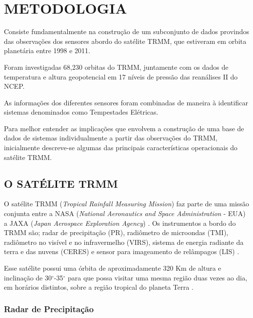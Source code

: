 \chapter{METODOLOGIA}

Consiste fundamentalmente na construção de um subconjunto de dados provindos das observações dos sensores abordo do satélite TRMM, que estiveram em orbita planetária entre 1998 e 2011. 

Foram investigadas 68,230 orbitas do TRMM, juntamente com os dados de temperatura e altura geopotencial em 17 níveis de pressão das reanálises II do NCEP. 

As informações dos diferentes sensores foram combinadas de maneira à identificar sistemas denominados como Tempestades Elétricas. 

Para melhor entender as implicações que envolvem a construção de uma base de dados de sistemas individualmente a partir das observações do TRMM, inicialmente descreve-se algumas das principais características operacionais do satélite TRMM.

\section{O SATÉLITE TRMM}

O satélite TRMM (\textit{Tropical Rainfall Measuring Mission})  faz parte de uma missão conjunta entre a NASA (\textit{National Aeronautics and Space Administration} - EUA) a JAXA (\textit{Japan Aerospace Exploration Agency}) \cite{simpson1988}. Os instrumentos a bordo do TRMM são; radar de precipitação (PR), radiômetro de microondas (TMI),  radiômetro no visível e no infravermelho (VIRS), sistema de energia radiante da terra e das nuvens (CERES) e sensor para imageamento de relâmpagos (LIS) \cite{kummerok1998}. 


Esse satélite possui uma órbita de aproximadamente 320 Km de altura e inclinação de 30$^{\circ}$-35$^{\circ}$ para que possa visitar uma mesma região duas vezes ao dia, em horários distintos, sobre a região tropical do planeta Terra \cite{simpson1988}.   

\subsection{Radar de Precipitação}

